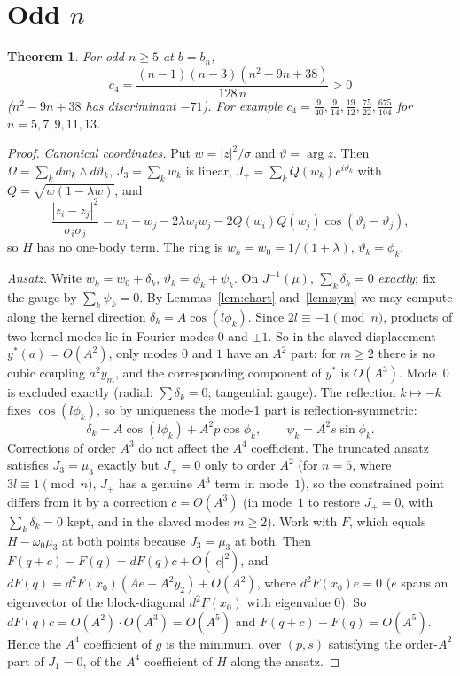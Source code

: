 \documentclass[11pt]{article}
\numberwithin{equation}{section}
\newtheorem{theorem}{Theorem}[section]
\theoremstyle{definition}
\theoremstyle{remark}
\begin{document}
\section{Odd \texorpdfstring{$n$}{n}}\label{sec:odd}

\begin{theorem}\label{thm:odd}
For odd $n\ge5$ at $b=b_n$,
\[
c_4=\frac{(n-1)(n-3)(n^2-9n+38)}{128\,n}>0
\]
($n^2-9n+38$ has discriminant $-71$). For example $c_4=\tfrac{9}{40},\tfrac{9}{14},\tfrac{19}{12},\tfrac{75}{22},\tfrac{675}{104}$
for $n=5,7,9,11,13$.
\end{theorem}

\begin{proof}
\emph{Canonical coordinates.} Put $w=|z|^2/\sigma$ and $\vartheta=\arg z$. Then
$\Omega=\sum_kdw_k\wedge d\vartheta_k$, $J_3=\sum_kw_k$ is linear, $J_+=\sum_kQ(w_k)e^{i\vartheta_k}$ with
$Q=\sqrt{w(1-\lambda w)}$, and
\[
\frac{|z_i-z_j|^2}{\sigma_i\sigma_j}=w_i+w_j-2\lambda w_iw_j-2Q(w_i)Q(w_j)\cos(\vartheta_i-\vartheta_j),
\]
so $H$ has no one-body term. The ring is $w_k=w_0=1/(1+\lambda)$, $\vartheta_k=\phi_k$.

\emph{Ansatz.} Write $w_k=w_0+\delta_k$, $\vartheta_k=\phi_k+\psi_k$. On $J^{-1}(\mu)$,
$\sum_k\delta_k=0$ \emph{exactly}; fix the gauge by $\sum_k\psi_k=0$. By Lemmas~\ref{lem:chart}
and~\ref{lem:sym} we may compute along the kernel direction $\delta_k=A\cos(l\phi_k)$. Since $2l\equiv-1
\pmod n$, products of two kernel modes lie in Fourier modes $0$ and $\pm1$. So in the slaved displacement
$y^*(a)=O(A^2)$, only modes $0$ and $1$ have an $A^2$ part: for $m\ge2$ there is no cubic coupling
$a^2y_m$, and the corresponding component of $y^*$ is $O(A^3)$. Mode~$0$ is excluded exactly (radial:
$\sum\delta_k=0$; tangential: gauge). The reflection $k\mapsto-k$ fixes $\cos(l\phi_k)$, so by uniqueness
the mode-1 part is reflection-symmetric:
\[
\delta_k=A\cos(l\phi_k)+A^2p\cos\phi_k,\qquad\psi_k=A^2s\sin\phi_k.
\]
Corrections of order $A^3$ do not affect the $A^4$ coefficient. The truncated ansatz satisfies $J_3=\mu_3$
exactly but $J_+=0$ only to order $A^2$ (for $n=5$, where $3l\equiv1\pmod n$, $J_+$ has a genuine $A^3$ term in
mode~$1$), so the constrained point differs from it by a correction $c=O(A^3)$ (in mode~$1$ to restore
$J_+=0$, with $\sum_k\delta_k=0$ kept, and in the slaved modes $m\ge2$). Work with $F$, which equals
$H-\omega_0\mu_3$ at both points because $J_3=\mu_3$ at both. Then $F(q+c)-F(q)=dF(q)c+O(|c|^2)$, and
$dF(q)=d^2F(x_0)(Ae+A^2y_2)+O(A^2)$, where $d^2F(x_0)e=0$ ($e$ spans an eigenvector of the block-diagonal
$d^2F(x_0)$ with eigenvalue $0$). So $dF(q)c=O(A^2)\cdot O(A^3)=O(A^5)$ and $F(q+c)-F(q)=O(A^5)$. Hence the
$A^4$ coefficient of $g$ is the minimum, over $(p,s)$ satisfying the order-$A^2$ part of $J_1=0$, of the $A^4$
coefficient of $H$ along the ansatz.


\end{proof}
\end{document}
